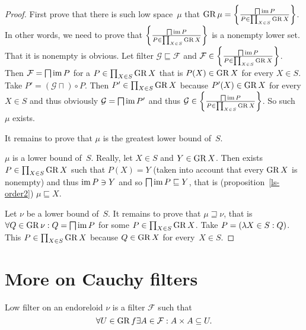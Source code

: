 \begin{proof}
First prove that there is such low space~$\mu$ that $\operatorname{GR}\mu=\left\{ \frac{\bigsqcap\operatorname{im} P}{P\in\prod_{X\in S}\operatorname{GR} X}\right\}$. In other words,
we need to prove that $\left\{ \frac{\bigsqcap\operatorname{im} P}{P\in\prod_{X\in S}\operatorname{GR} X}\right\}$ is a nonempty lower set. That it is nonempty is obvious.
Let filter $\mathcal{G}\sqsubseteq\mathcal{F}$ and $\mathcal{F}\in\left\{ \frac{\bigsqcap\operatorname{im} P}{P\in\prod_{X\in S}\operatorname{GR} X}\right\}$. Then
$\mathcal{F}=\bigsqcap\operatorname{im} P$ for a $P\in\prod_{X\in S}\operatorname{GR} X$ that is $P(X)\in\operatorname{GR} X$ for every $X\in S$. Take $P'=(\mathcal{G}\sqcap)\circ P$.
Then $P'\in\prod_{X\in S}\operatorname{GR} X$ because $P'(X)\in\operatorname{GR} X$ for every $X\in S$ and thus
obviously $\mathcal{G}=\bigsqcap\operatorname{im} P'$ and thus $\mathcal{G}\in\left\{ \frac{\bigsqcap\operatorname{im} P}{P\in\prod_{X\in S}\operatorname{GR} X}\right\}$. So such~$\mu$ exists.

It remains to prove that $\mu$ is the greatest lower bound of~$S$.

$\mu$ is a lower bound of~$S$. Really, let $X\in S$ and $Y\in\operatorname{GR} X$.
Then exists $P\in\prod_{X\in S}\operatorname{GR} X$ such that $P(X)=Y$ (taken into account that every $\operatorname{GR} X$ is nonempty)
and thus $\operatorname{im} P\ni Y$ and so $\bigsqcap\operatorname{im} P\sqsubseteq Y$, that is (proposition~\ref{ls-order2}) $\mu\sqsubseteq X$.

Let $\nu$ be a lower bound of~$S$. It remains to prove that $\mu\sqsupseteq\nu$, that is
$\forall Q\in\operatorname{GR}\nu: Q=\bigsqcap\operatorname{im} P$ for some $P\in\prod_{X\in S}\operatorname{GR} X$.
Take $P=(\lambda X\in S:Q)$. This $P\in\prod_{X\in S}\operatorname{GR} X$ because $Q\in\operatorname{GR} X$ for every~$X\in S$.
\end{proof}




\section{More on Cauchy filters}

\begin{obvious}
Low filter on an endoreloid $\nu$ is a filter $\mathcal{F}$ such that
\[ \forall U \in \operatorname{GR} f \exists A \in \mathcal{F} : A \times A \subseteq
   U. \]
\end{obvious}

